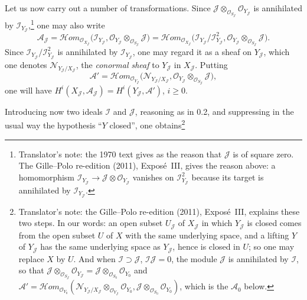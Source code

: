 

Let us now carry out a number of transformations. Since
\(\mathscr J\otimes_{\mathscr O_{S_{\mathscr J}}}\mathscr O_{Y_{\mathscr J}}\) is
annihilated by \(\mathscr I_{Y_{\mathscr J}}\),\footnote{Translator's note: the
1970 text gives as the reason that \(\mathscr J\) is of square zero. The
Gille--Polo re-edition (2011), Exposé~III, gives the reason above: a
homomorphism \(\mathscr I_{Y_{\mathscr J}}\to\mathscr J\otimes
\mathscr O_{Y_{\mathscr J}}\) vanishes on \(\mathscr I_{Y_{\mathscr J}}^2\)
because its target is annihilated by \(\mathscr I_{Y_{\mathscr J}}\).} one
may also write
\[
 \mathscr A_{\mathscr J}
 =\mathscr{H}om_{\mathscr O_{X_{\mathscr J}}}
  \bigl(\mathscr I_{Y_{\mathscr J}},
  \mathscr O_{Y_{\mathscr J}}\otimes_{\mathscr O_{S_{\mathscr J}}}\mathscr J\bigr)
 =\mathscr{H}om_{\mathscr O_{X_{\mathscr J}}}
  \bigl(\mathscr I_{Y_{\mathscr J}}/\mathscr I_{Y_{\mathscr J}}^2,
  \mathscr O_{Y_{\mathscr J}}\otimes_{\mathscr O_{S_{\mathscr J}}}\mathscr J\bigr).
\]
Since \(\mathscr I_{Y_{\mathscr J}}/\mathscr I_{Y_{\mathscr J}}^2\) is annihilated
by \(\mathscr I_{Y_{\mathscr J}}\), one may regard it as a sheaf on
\(Y_{\mathscr J}\), which one denotes \(\mathscr N_{Y_{\mathscr J}/X_{\mathscr J}}\),
the \emph{conormal sheaf} to \(Y_{\mathscr J}\) in \(X_{\mathscr J}\). Putting
\[
 \mathscr A'=\mathscr{H}om_{\mathscr O_{Y_{\mathscr J}}}
 \bigl(\mathscr N_{Y_{\mathscr J}/X_{\mathscr J}},
 \mathscr O_{Y_{\mathscr J}}\otimes_{\mathscr O_{S_{\mathscr J}}}\mathscr J\bigr),
\]
one will have \(H^i(X_{\mathscr J},\mathscr A_{\mathscr J})
=H^i(Y_{\mathscr J},\mathscr A')\), \(i\geq0\).

Introducing now two ideals \(\mathscr I\) and \(\mathscr J\), reasoning as in
0.2, and suppressing in the usual way the hypothesis ``\(Y\) closed'', one
obtains\footnote{Translator's note: the Gille--Polo re-edition (2011), Exposé~III, explains these two steps. In our words: an
open subset \(U_{\mathscr J}\) of \(X_{\mathscr J}\) in which \(Y_{\mathscr J}\)
is closed comes from the open subset \(U\) of \(X\) with the same underlying
space, and a lifting \(Y\) of \(Y_{\mathscr J}\) has the same underlying space
as \(Y_{\mathscr J}\), hence is closed in \(U\); so one may replace \(X\) by
\(U\). And when \(\mathscr I\supset\mathscr J\), \(\mathscr I\mathscr J=0\),
the module \(\mathscr J\) is annihilated by \(\mathscr I\), so that
\(\mathscr J\otimes_{\mathscr O_{S_{\mathscr J}}}\mathscr O_{Y_{\mathscr J}}
=\mathscr J\otimes_{\mathscr O_{S_0}}\mathscr O_{Y_0}\) and
\(\mathscr A'=\mathscr{H}om_{\mathscr O_{Y_0}}(\mathscr N_{Y_{\mathscr J}/
X_{\mathscr J}}\otimes_{\mathscr O_{Y_{\mathscr J}}}\mathscr O_{Y_0},
\mathscr J\otimes_{\mathscr O_{S_0}}\mathscr O_{Y_0})\), which is the
\(\mathscr A_0\) below.}

